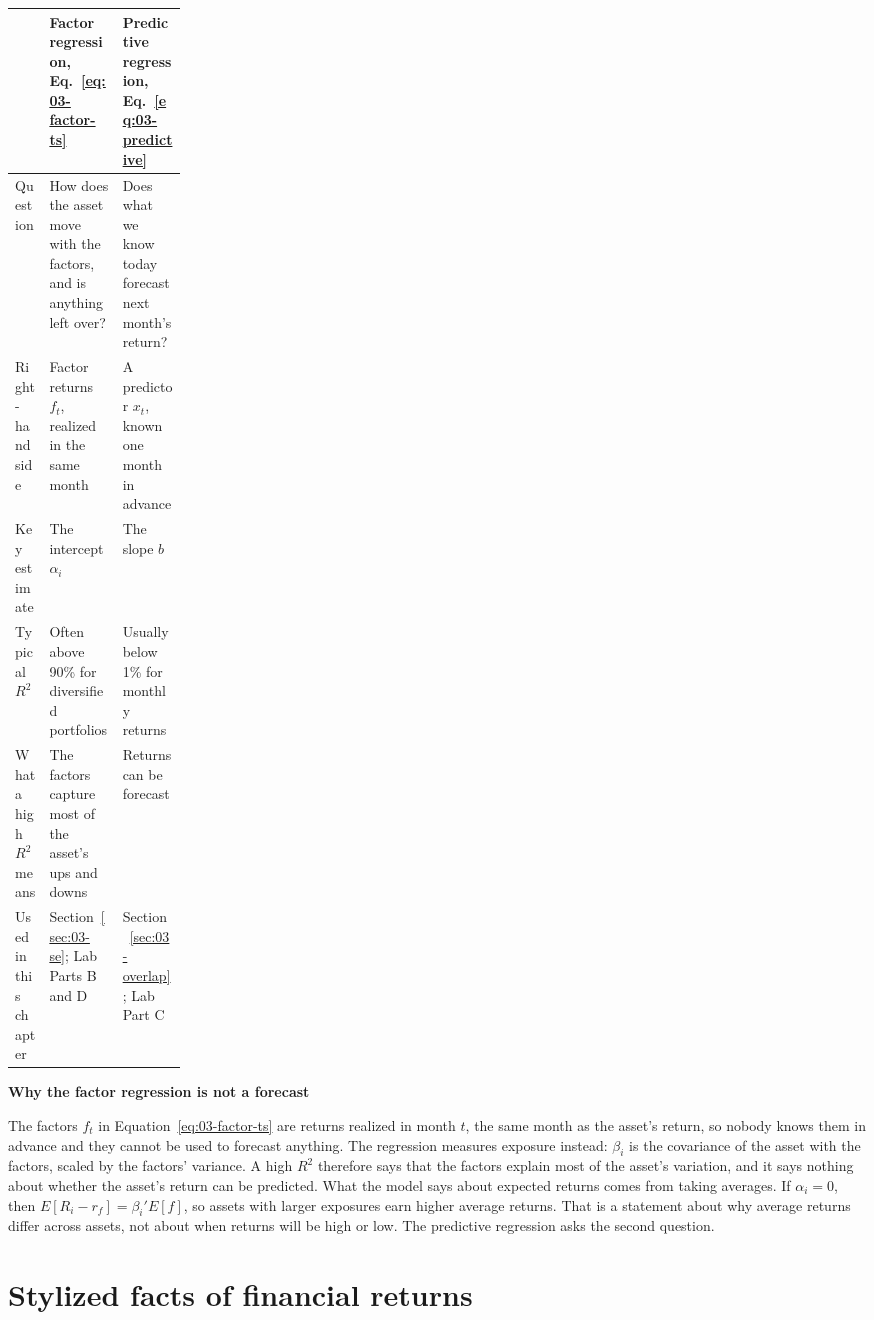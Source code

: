 \begin{center}
\small
\begin{tabularx}{0.95\linewidth}{@{}>{\raggedright\arraybackslash}p{0.20\linewidth}>{\raggedright\arraybackslash}X>{\raggedright\arraybackslash}X@{}}
\toprule
 & Factor regression, Eq.~\eqref{eq:03-factor-ts} & Predictive regression, Eq.~\eqref{eq:03-predictive} \\
\midrule
Question & How does the asset move with the factors, and is anything left over? & Does what we know today forecast next month's return? \\
Right-hand side & Factor returns $f_t$, realized in the same month & A predictor $x_t$, known one month in advance \\
Key estimate & The intercept $\alpha_i$ & The slope $b$ \\
Typical $R^2$ & Often above 90\% for diversified portfolios & Usually below 1\% for monthly returns \\
What a high $R^2$ means & The factors capture most of the asset's ups and downs & Returns can be forecast \\
Used in this chapter & Section~\ref{sec:03-se}; Lab Parts B and D & Section~\ref{sec:03-overlap}; Lab Part C \\
\bottomrule
\end{tabularx}
\end{center}

\begin{callout}
\noindent\textbf{Why the factor regression is not a forecast}

The factors $f_t$ in Equation~\eqref{eq:03-factor-ts} are returns realized in month $t$, the same month as the asset's return, so nobody knows them in advance and they cannot be used to forecast anything. The regression measures exposure instead: $\beta_i$ is the covariance of the asset with the factors, scaled by the factors' variance. A high $R^2$ therefore says that the factors explain most of the asset's variation, and it says nothing about whether the asset's return can be predicted. What the model says about expected returns comes from taking averages. If $\alpha_i = 0$, then $E[R_i - r_f] = \beta_i' E[f]$, so assets with larger exposures earn higher average returns. That is a statement about why average returns differ across assets, not about when returns will be high or low. The predictive regression asks the second question.
\end{callout}


\section{Stylized facts of financial returns}
\label{sec:03-facts}

